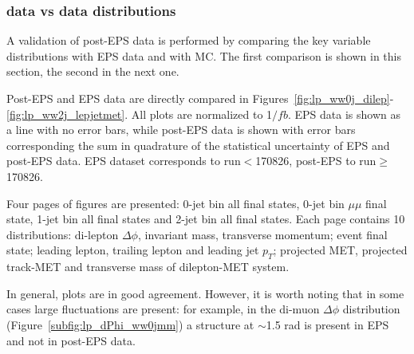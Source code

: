 \subsubsection{data vs data distributions}

A validation of post-EPS data is performed by comparing the key variable distributions with EPS data and with MC.
The first comparison is shown in this section, the second in the next one.

Post-EPS and EPS data are directly compared in Figures~\ref{fig:lp_ww0j_dilep}-\ref{fig:lp_ww2j_lepjetmet}. 
All plots are normalized to 1$/fb$. 
EPS data is shown as a line with no error bars, while post-EPS data is shown with error bars corresponding the sum in quadrature of the 
statistical uncertainty of EPS and post-EPS data. 
EPS dataset corresponds to run$<$170826, post-EPS to run$\geq$170826.

Four pages of figures are presented: 0-jet bin all final states, 0-jet bin $\mu\mu$ final state, 1-jet bin all final states and 2-jet bin all final states. 
Each page contains 10 distributions: di-lepton $\Delta\phi$, invariant mass, transverse momentum; event final state; leading lepton, trailing lepton 
and leading jet $p_T$; projected MET, projected track-MET and transverse mass of dilepton-MET system.

In general, plots are in good agreement. However, it is worth noting that in some cases large fluctuations are present: for example, in the di-muon   
$\Delta\phi$ distribution (Figure~\ref{subfig:lp_dPhi_ww0jmm}) a structure at $\sim$1.5 rad is present in EPS and not in post-EPS data.

\clearpage

